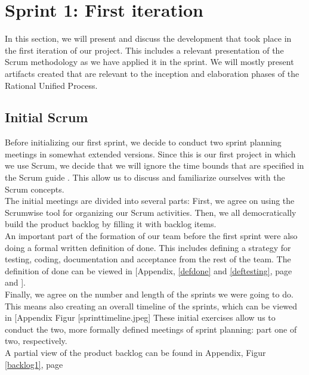 \section{Sprint 1: First iteration}
In this section, we will present and discuss the development that took place in the first iteration of our project. This includes a relevant presentation of the Scrum methodology as we have applied it in the sprint. We will mostly present artifacts created that are relevant to the inception and elaboration phases of the Rational Unified Process.
\subsection{Initial Scrum}
Before initializing our first sprint, we decide to conduct two sprint planning meetings in somewhat extended versions. Since this is our first project in which we use Scrum, we decide that we will ignore the time bounds that are specified in the Scrum guide \cite[p.~9]{scrumguide}. This allow us to discuss and familiarize ourselves with the Scrum concepts.\\
The initial meetings are divided into several parts: First, we agree on using the Scrumwise \cite{scrumwise} tool for organizing our Scrum activities. Then, we all democratically build the product backlog by filling it with backlog items. \\
An important part of the formation of our team before the first sprint were also doing a formal written definition of done. This includes defining a strategy for testing, coding, documentation and acceptance from the rest of the team. The definition of done can be viewed in [Appendix, \ref{defdone} and \ref{deftesting}, page \pageref{defdone} and \pageref{deftesting}].\\
Finally, we agree on the number and length of the sprints we were going to do. This means also creating an overall timeline of the sprints, which can be viewed in [Appendix Figur [sprinttimeline.jpeg]  These initial exercises allow us to conduct the two, more formally defined meetings of sprint planning: part one of two, respectively. \\
A partial view of the product backlog can be found in Appendix, Figur \ref{backlog1}, page \pageref{backlog1} 

